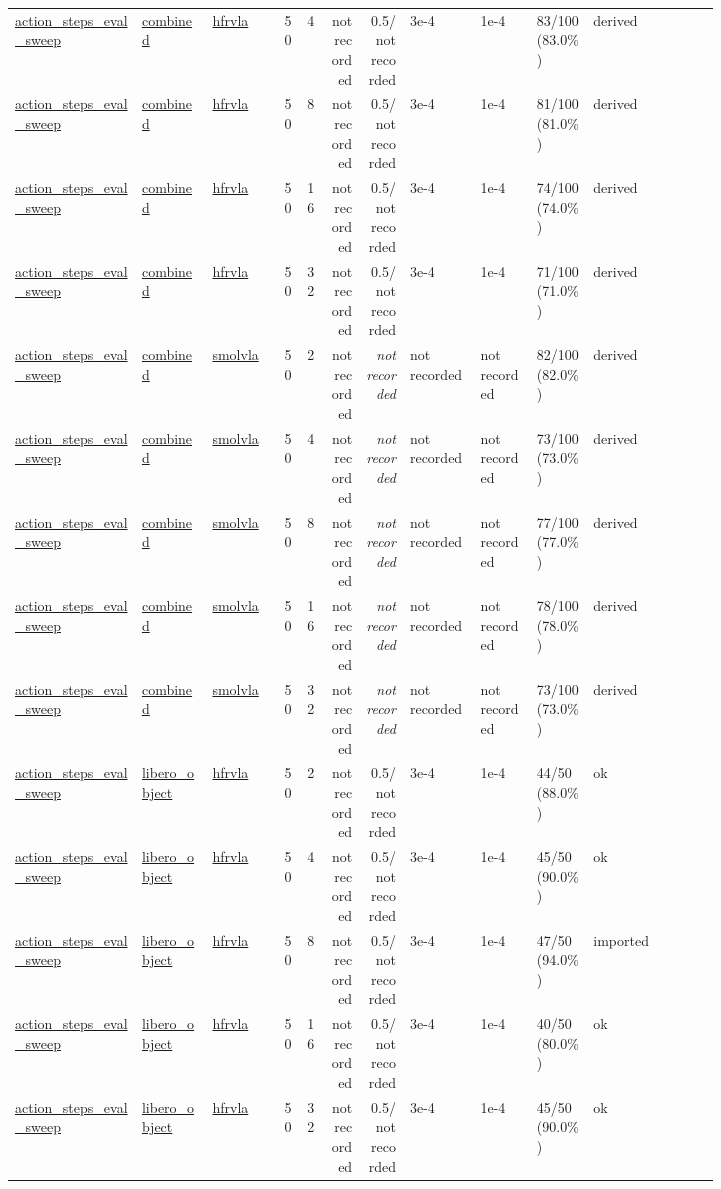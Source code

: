 \begin{tiny}
\begin{longtable}{@{}p{0.18\linewidth}p{0.10\linewidth}p{0.10\linewidth}rrrrp{0.10\linewidth}p{0.08\linewidth}p{0.08\linewidth}p{0.11\linewidth}p{0.07\linewidth}@{}}
\url{action_steps_eval_sweep} & \url{combined} & \url{hfrvla} & 50 & 4 & not recorded & 0.5/not recorded & 3e-4 & 1e-4 & 83/100 (83.0\%) & derived \\
\url{action_steps_eval_sweep} & \url{combined} & \url{hfrvla} & 50 & 8 & not recorded & 0.5/not recorded & 3e-4 & 1e-4 & 81/100 (81.0\%) & derived \\
\url{action_steps_eval_sweep} & \url{combined} & \url{hfrvla} & 50 & 16 & not recorded & 0.5/not recorded & 3e-4 & 1e-4 & 74/100 (74.0\%) & derived \\
\url{action_steps_eval_sweep} & \url{combined} & \url{hfrvla} & 50 & 32 & not recorded & 0.5/not recorded & 3e-4 & 1e-4 & 71/100 (71.0\%) & derived \\
\url{action_steps_eval_sweep} & \url{combined} & \url{smolvla} & 50 & 2 & not recorded & \emph{not recorded} & not recorded & not recorded & 82/100 (82.0\%) & derived \\
\url{action_steps_eval_sweep} & \url{combined} & \url{smolvla} & 50 & 4 & not recorded & \emph{not recorded} & not recorded & not recorded & 73/100 (73.0\%) & derived \\
\url{action_steps_eval_sweep} & \url{combined} & \url{smolvla} & 50 & 8 & not recorded & \emph{not recorded} & not recorded & not recorded & 77/100 (77.0\%) & derived \\
\url{action_steps_eval_sweep} & \url{combined} & \url{smolvla} & 50 & 16 & not recorded & \emph{not recorded} & not recorded & not recorded & 78/100 (78.0\%) & derived \\
\url{action_steps_eval_sweep} & \url{combined} & \url{smolvla} & 50 & 32 & not recorded & \emph{not recorded} & not recorded & not recorded & 73/100 (73.0\%) & derived \\
\url{action_steps_eval_sweep} & \url{libero_object} & \url{hfrvla} & 50 & 2 & not recorded & 0.5/not recorded & 3e-4 & 1e-4 & 44/50 (88.0\%) & ok \\
\url{action_steps_eval_sweep} & \url{libero_object} & \url{hfrvla} & 50 & 4 & not recorded & 0.5/not recorded & 3e-4 & 1e-4 & 45/50 (90.0\%) & ok \\
\url{action_steps_eval_sweep} & \url{libero_object} & \url{hfrvla} & 50 & 8 & not recorded & 0.5/not recorded & 3e-4 & 1e-4 & 47/50 (94.0\%) & imported \\
\url{action_steps_eval_sweep} & \url{libero_object} & \url{hfrvla} & 50 & 16 & not recorded & 0.5/not recorded & 3e-4 & 1e-4 & 40/50 (80.0\%) & ok \\
\url{action_steps_eval_sweep} & \url{libero_object} & \url{hfrvla} & 50 & 32 & not recorded & 0.5/not recorded & 3e-4 & 1e-4 & 45/50 (90.0\%) & ok \\

\end{longtable}
\end{tiny}
